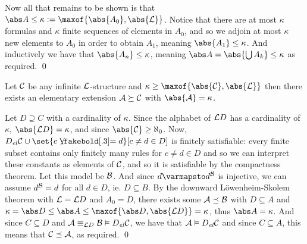 Now all that remains to be shown is that $\abs A\leq\kappa\coloneqq\maxof{\abs{A_0},\abs{{\cal L}}}$.
Notice that there are at most $\kappa$ formulas and $\kappa$ finite sequences of elements in $A_0$, and so we adjoin at most $\kappa$ new elements to $A_0$ in order to obtain $A_1$, meaning
$\abs{A_1}\leq\kappa$.
And inductively we have that $\abs{A_n}\leq\kappa$, meaning $\abs A=\abs{\bigcup A_k}\leq\kappa$ as required.
\qed

\bthrm[title=Upward L\"owenheim-Skolem Theorem, name=uplowskol]

    Let ${\cal C}$ be any infinite ${\cal L}$-structure and $\kappa\geq\maxof{\abs{{\cal C}},\abs{{\cal L}}}$ then there exists an elementary extension ${\cal A}\succeq{\cal C}$ with $\abs{{\cal A}}=\kappa$.

\ethrm

Let $D\supseteq C$ with a cardinality of $\kappa$.
Since the alphabet of ${\cal L}D$ has a cardinality of $\kappa$, $\abs{{\cal L}D}=\kappa$, and since $\abs{{\cal C}}\geq\aleph_0$.
Now, $D_{\it el}{\cal C}\cup\set{c\neqb d}[c\neq d\in D]$ is finitely satisfiable: every finite subset contains only finitely many rules for $c\neq d\in D$ and so we can interpret these constants as
elements of ${\cal C}$, and so it is satisfiable by the compactness theorem.
Let this model be ${\cal B}$.
And since $d\varmapsto d^{\cal B}$ is injective, we can assume $d^{\cal B}=d$ for all $d\in D$, ie. $D\subseteq B$.
By the downward L\"owenheim-Skolem theorem with ${\cal L}={\cal L}D$ and $A_0=D$, there exists some ${\cal A}\preceq{\cal B}$ with $D\subseteq A$ and
$\kappa=\abs D\leq\abs A\leq\maxof{\abs D,\abs{{\cal L}D}}=\kappa$, thus $\abs A=\kappa$.
And since $C\subseteq D$ and ${\cal A}\equiv_{{\cal L}D}{\cal B}\vDash D_{\it el}{\cal C}$, we have that ${\cal A}\vDash D_{\it el}{\cal C}$ and since $C\subseteq A$, this means that
${\cal C}\preceq{\cal A}$, as required.
\qed

